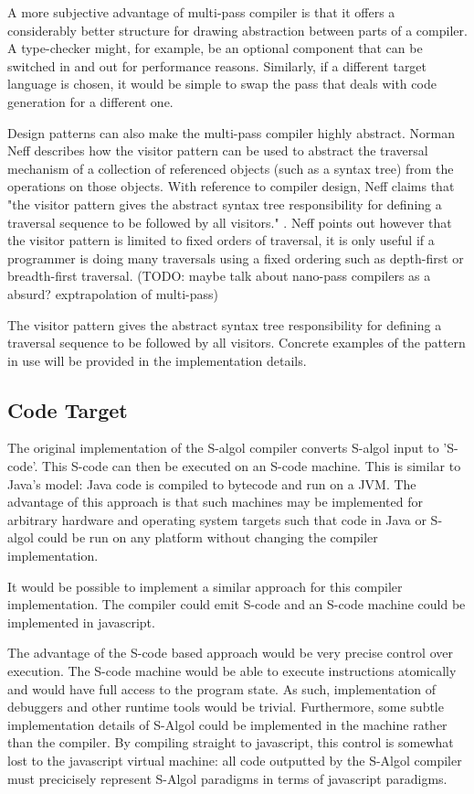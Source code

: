 \documentclass{article}
\begin{document}
A more subjective advantage of multi-pass compiler is that it offers a considerably better structure for drawing abstraction between parts of a compiler. A type-checker might, for example, be an optional component that can be switched in and out for performance reasons. Similarly, if a different target language is chosen, it would be simple to swap the pass that deals with code generation for a different one.

Design patterns can also make the multi-pass compiler highly abstract. Norman Neff describes how the visitor pattern can be used to abstract the traversal mechanism of a collection of referenced objects (such as a syntax tree) from the operations on those objects. With reference to compiler design, Neff claims that "the visitor pattern gives the abstract syntax tree responsibility for defining a traversal sequence to be followed by all visitors." \cite{neff1999oo}. Neff points out however that the visitor pattern is limited to fixed orders of traversal, it is only useful if a programmer is doing many traversals using a fixed ordering such as depth-first or breadth-first traversal. (TODO: maybe talk about nano-pass compilers as a absurd? exptrapolation of multi-pass)

The visitor pattern gives the abstract syntax tree responsibility for defining a traversal sequence to be followed by all visitors. Concrete examples of the pattern in use will be provided in the implementation details.

\subsection{Code Target}

The original implementation of the S-algol compiler converts S-algol input to 'S-code'. This S-code can then be executed on an S-code machine. This is similar to Java's model: Java code is compiled to bytecode and run on a JVM. The advantage of this approach is that such machines may be implemented for arbitrary hardware and operating system targets such that code in Java or S-algol could be run on any platform without changing the compiler implementation.

It would be possible to implement a similar approach for this compiler implementation. The compiler could emit S-code and an S-code machine could be implemented in javascript.

The advantage of the S-code based approach would be very precise control over execution. The S-code machine would be able to execute instructions atomically and would have full access to the program state. As such, implementation of debuggers and other runtime tools would be trivial. Furthermore, some subtle implementation details of S-Algol could be implemented in the machine rather than the compiler. By compiling straight to javascript, this control is somewhat lost to the javascript virtual machine: all code outputted by the S-Algol compiler must precicisely represent S-Algol paradigms in terms of javascript paradigms.
\end{document}
